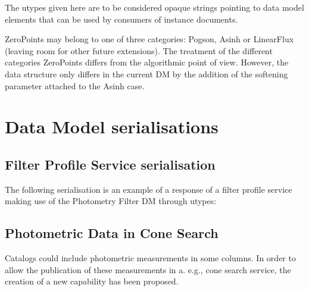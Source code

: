 \documentclass[11pt,a4paper]{ivoa}
\begin{document}
\begin{appendices}

The utypes given here are to be considered opaque strings pointing to data model
elements that can be used by consumers of instance documents.

ZeroPoints may belong to one of three categories: Pogson, Asinh or LinearFlux 
(leaving room for other future extensions). The treatment of the different 
categories ZeroPoints differs from the algorithmic point of view.
However, the data structure only differs in the current DM by the addition 
of the softening parameter attached to the Asinh case.

\par

\section{Data Model serialisations} \label{serialisation}
\subsection{Filter Profile Service serialisation} \label{serialisationfilter}

    
The following serialisation is an example of a response of a filter profile 
service making use of the Photometry Filter DM through utypes:
\par


\subsection{Photometric Data in Cone Search}
Catalogs could include photometric measurements in some columns. In order 
to allow the publication of these measurements in a. e.g., cone search 
service, the creation of a new capability has been proposed.
\par


\end{appendices}
\end{document}
